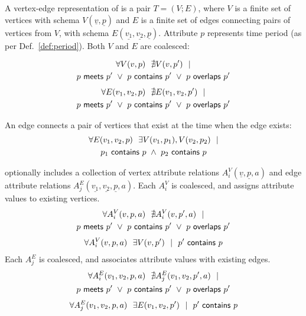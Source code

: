 \begin{definition}
A vertex-edge representation of \tg is a pair $T=(V; E)$, where $V$ is
a finite set of vertices with schema $V(\underline{v}, \underline{p})$
and $E$ is a finite set of edges connecting pairs of vertices from
$V$, with schema $E(\underline{v_1}, \underline{v_2}, \underline{p})$.
Attribute $p$ represents time period (as per Def.~\ref{def:period}).
Both $V$ and $E$ are coalesced:

\begin{multline}
\forall V(v, p)~~\nexists V(v, p')~~| \\
                       p~\mathsf{meets}~p'~\lor~p~\mathsf{contains}~p'~\lor~p~\mathsf{overlaps}~p'
\label{def:tg:c2}
\end{multline}
\vspace{-0.5cm}
\begin{multline}
\forall E(v_1, v_2, p)~~\nexists E(v_1,v_2, p')~~| \\
                       p~\mathsf{meets}~p'~\lor~p~\mathsf{contains}~p'~\lor~p~\mathsf{overlaps}~p'
\label{def:tg:c3}
\end{multline}

An edge connects a pair of vertices that exist at the time when the edge exists:
\begin{multline}
\forall E(v_1, v_2, p)~~\exists V(v_1, p_1), V(v_2, p_2)~~| \\
                       p_1~\mathsf{contains}~p~\wedge~p_2~\mathsf{contains}~p
\label{def:tg:c1}
\end{multline}
\vspace{-0.5cm}

 optionally includes a collection of vertex attribute
relations $A^{V}_i(\underline{v},\underline{p},a)$ and edge attribute
relations
$A^{E}_j(\underline{v_1},\underline{v_2},\underline{p},a)$. Each
$A^{V}_i$ is coalesced, and assigns attribute values to existing
vertices.
\begin{multline}
\forall A^{V}_i(v, p, a)~~\nexists A^{V}_i(v, p', a)~~| \\
                       p~\mathsf{meets}~p'~\lor~p~\mathsf{contains}~p'~\lor~p~\mathsf{overlaps}~p'
\label{def:tg:c4}
\end{multline}
\begin{multline}
\forall A^{V}_i(v, p, a)~~\exists V(v,p')~~|~~p'~\mathsf{contains}~p
\label{def:tg:c5}
\end{multline}
Each $A^{E}_j$ is coalesced, and associates attribute values with
existing edges.
\begin{multline}
\forall A^{E}_i(v_1, v_2, p, a)~~\nexists A^{E}_j(v_1, v_2, p', a)~~| \\
                       p~\mathsf{meets}~p'~\lor~p~\mathsf{contains}~p'~\lor~p~\mathsf{overlaps}~p'
\label{def:tg:c6}
\end{multline}
\begin{multline}
\forall A^{E}_j(v_1, v_2, p, a)~~\exists E(v_1,v_2,p')~~|~~p'~\mathsf{contains}~p
\label{def:tg:c7}
\end{multline}

\label{def:tg}
\end{definition}

